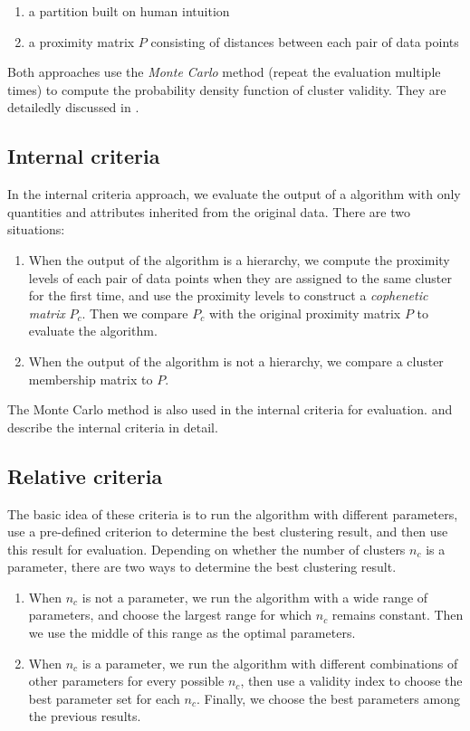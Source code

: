 \documentclass[conference]{IEEEtran}
\begin{document}
\begin{enumerate}
\item a partition built on human intuition
\item a proximity matrix $P$ consisting of distances between each pair of data points
\end{enumerate}

Both approaches use the \textit{Monte Carlo} method (repeat the evaluation multiple times) to compute the probability density function of cluster validity. They are detailedly discussed in \cite{Halkidi:2002:CVM:565117.565124}.

\subsection{Internal criteria}
In the internal criteria approach, we evaluate the output of a algorithm with only quantities and attributes inherited from the original data. There are two situations:

\begin{enumerate}
\item When the output of the algorithm is a hierarchy, we compute the proximity levels of each pair of data points when they are assigned to the same cluster for the first time, and use the proximity levels to construct a \textit{cophenetic matrix} $P_c$. Then we compare $P_c$ with the original proximity matrix $P$ to evaluate the algorithm.
\item When the output of the algorithm is not a hierarchy, we compare a cluster membership matrix to $P$.
\end{enumerate}

The Monte Carlo method is also used in the internal criteria for evaluation. \cite{Halkidi:2002:CVM:565117.565124} and \cite{milligan1981monte} describe the internal criteria in detail.

\subsection{Relative criteria}
The basic idea of these criteria is to run the algorithm with different parameters, use a pre-defined criterion to determine the best clustering result, and then use this result for evaluation. Depending on whether the number of clusters $n_c$ is a parameter, there are two ways to determine the best clustering result.

\begin{enumerate}
\item When $n_c$ is not a parameter, we run the algorithm with a wide range of parameters, and choose the largest range for which $n_c$ remains constant. Then we use the middle of this range as the optimal parameters.
\item When $n_c$ is a parameter, we run the algorithm  with different combinations of other parameters for every possible $n_c$, then use a validity index to choose the best parameter set for each $n_c$. Finally, we choose the best parameters among the previous results.
\end{enumerate}
\end{document}
